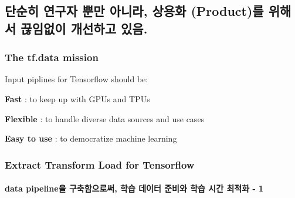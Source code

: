 \documentclass[11pt]{article}
\begin{document}
\hypertarget{uxb2e8uxc21cuxd788-uxc5f0uxad6cuxc790-uxbfd0uxb9cc-uxc544uxb2c8uxb77c-uxc0c1uxc6a9uxd654-productuxb97c-uxc704uxd574uxc11c-uxb04auxc784uxc5c6uxc774-uxac1cuxc120uxd558uxace0-uxc788uxc74c.}{%
\subsection{단순히 연구자 뿐만 아니라, 상용화 (Product)를 위해서
끊임없이 개선하고
있음.}\label{uxb2e8uxc21cuxd788-uxc5f0uxad6cuxc790-uxbfd0uxb9cc-uxc544uxb2c8uxb77c-uxc0c1uxc6a9uxd654-productuxb97c-uxc704uxd574uxc11c-uxb04auxc784uxc5c6uxc774-uxac1cuxc120uxd558uxace0-uxc788uxc74c.}}

\hypertarget{the-tf.data-mission}{%
\subsubsection{\texorpdfstring{\textbf{The tf.data
mission}}{The tf.data mission}}\label{the-tf.data-mission}}

Input piplines for Tensorflow should be:

\textbf{Fast} : to keep up with GPUs and TPUs

\textbf{Flexible} : to handle diverse data sources and use cases

\textbf{Easy to use} : to democratize machine learning

    \hypertarget{extract-transform-load-for-tensorflow}{%
\subsubsection{Extract Transform Load for
Tensorflow}\label{extract-transform-load-for-tensorflow}}

\hypertarget{data-pipelineuxc744-uxad6cuxcd95uxd568uxc73cuxb85cuxc368-uxd559uxc2b5-uxb370uxc774uxd130-uxc900uxbe44uxc640-uxd559uxc2b5-uxc2dcuxac04-uxcd5cuxc801uxd654---1}{%
\paragraph{data pipeline을 구축함으로써, 학습 데이터 준비와 학습 시간
최적화 -
1}\label{data-pipelineuxc744-uxad6cuxcd95uxd568uxc73cuxb85cuxc368-uxd559uxc2b5-uxb370uxc774uxd130-uxc900uxbe44uxc640-uxd559uxc2b5-uxc2dcuxac04-uxcd5cuxc801uxd654---1}}
\end{document}
